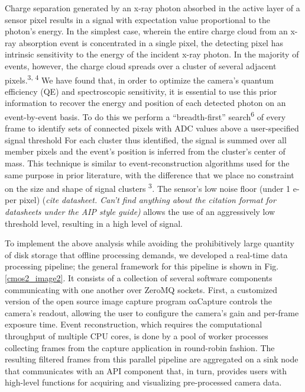 Charge separation generated by an x-ray photon absorbed in the active
layer of a sensor pixel results in a signal with expectation value
proportional to the photon's energy. In the simplest case, wherein the
entire charge cloud from an x-ray absorption event is concentrated in a
single pixel, the detecting pixel has intrinsic sensitivity to the
energy of the incident x-ray photon. In the majority of events, however,
the charge cloud spreads over a cluster of several adjacent
pixels.\textsuperscript{3, 4} We have found that, in order to optimize
the camera's quantum efficiency (QE) and spectroscopic sensitivity, it
is essential to use this prior information to recover the energy and
position of each detected photon on an event-by-event basis. To do this
we perform a ``breadth-first'' search\textsuperscript{6} of every frame
to identify sets of connected pixels with ADC values above a
user-specified signal threshold For each cluster thus identified, the
signal is summed over all member pixels and the event's position is
inferred from the cluster's center of mass. This technique is similar to
event-reconstruction algorithms used for the same purpose in prior
literature, with the difference that we place no constraint on the size
and shape of signal clusters \textsuperscript{3}\emph{.} The sensor's
low noise floor (under 1 e- per pixel) (\emph{cite datasheet. Can't find
anything about the citation format for datasheets under the AIP style
guide)} allows the use of an aggressively low threshold level, resulting
in a high level of signal.

To implement the above analysis while avoiding the prohibitively large
quantity of disk storage that offline processing demands, we developed a
real-time data processing pipeline; the general framework for this
pipeline is shown in Fig. \ref{cmos2_image2}. It consists of a collection of several
software components communicating with one another over ZeroMQ sockets.
First, a customized version of the open source image capture program
oaCapture controls the camera's readout, allowing the user to configure
the camera's gain and per-frame exposure time. Event reconstruction,
which requires the computational throughput of multiple CPU cores, is
done by a pool of worker processes collecting frames from the capture
application in round-robin fashion. The resulting filtered frames from
this parallel pipeline are aggregated on a sink node that communicates
with an API component that, in turn, provides users with high-level
functions for acquiring and visualizing pre-processed camera data.

